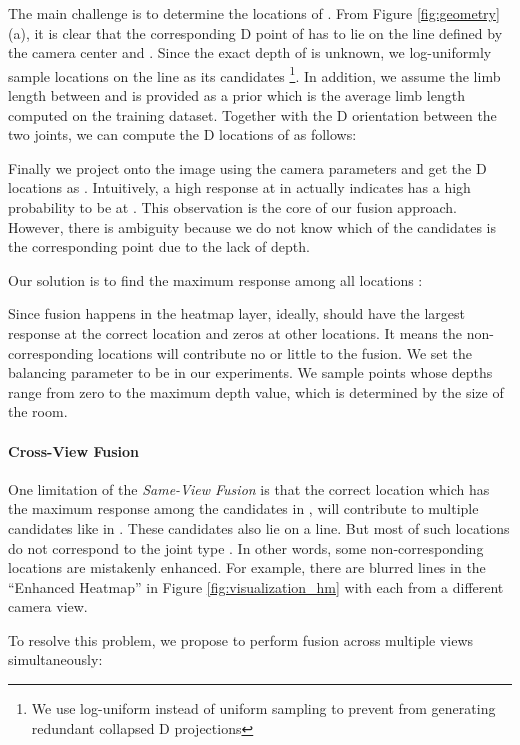 \documentclass[10pt,twocolumn,letterpaper]{article}
\begin{document}
The main challenge is to determine the locations of . From Figure \ref{fig:geometry} (a), it is clear that the corresponding D point  of  has to lie on the line defined by the camera center  and . Since the exact depth of  is unknown, we log-uniformly sample  locations   on the line as its candidates \footnote{We use log-uniform instead of uniform sampling to prevent from generating redundant collapsed D projections}. In addition, we assume the limb length  between  and  is provided as a prior which is the average limb length computed on the training dataset. Together with the D orientation  between the two joints, we can compute the D locations of  as follows:

Finally we project  onto the image using the camera parameters and get the D locations as . Intuitively, a high response at  in  actually indicates  has a high probability to be at . This observation is the core of our fusion approach. However, there is ambiguity because we do not know which of the  candidates  is the corresponding point due to the lack of depth. 



Our solution is to find the maximum response among all locations :

Since fusion happens in the heatmap layer, ideally,  should have the largest response at the correct  location and zeros at other locations. It means the non-corresponding locations will contribute no or little to the fusion. We set the balancing parameter  to be  in our experiments. We sample  points whose depths range from zero to the maximum depth value, which is determined by the size of the room.



\paragraph{Cross-View Fusion}
One limitation of the \emph{Same-View Fusion} is that the correct location  which has the maximum response among the  candidates in , will contribute to multiple candidates like  in . These candidates also lie on a line. But most of such locations do not correspond to the joint type . In other words, some non-corresponding locations are mistakenly enhanced. For example, there are blurred lines in the ``Enhanced Heatmap'' in Figure \ref{fig:visualization_hm} with each from a different camera view.

To resolve this problem, we propose to perform fusion across multiple views simultaneously:
\end{document}
